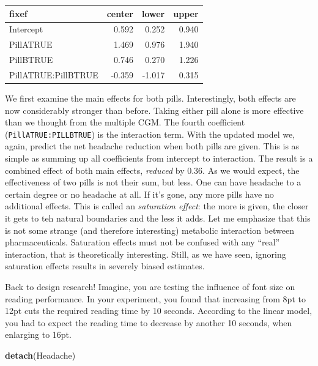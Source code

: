 \documentclass[]{svmono}
\newenvironment{Shaded}{\begin{snugshade}}{\end{snugshade}}
\newcommand{\KeywordTok}[1]{\textcolor[rgb]{0.13,0.29,0.53}{\textbf{#1}}}
\newcommand{\NormalTok}[1]{#1}
\theoremstyle{definition}
\theoremstyle{definition}
\theoremstyle{definition}
\theoremstyle{remark}
\begin{document}
\begin{longtable}[]{@{}lrrr@{}}
\toprule
fixef & center & lower & upper\tabularnewline
\midrule
\endhead
Intercept & 0.592 & 0.252 & 0.940\tabularnewline
PillATRUE & 1.469 & 0.976 & 1.940\tabularnewline
PillBTRUE & 0.746 & 0.270 & 1.226\tabularnewline
PillATRUE:PillBTRUE & -0.359 & -1.017 & 0.315\tabularnewline
\bottomrule
\end{longtable}

We first examine the main effects for both pills. Interestingly, both
effects are now considerably stronger than before. Taking either pill
alone is more effective than we thought from the multiple CGM. The
fourth coefficient (\texttt{PillATRUE:PILLBTRUE}) is the interaction
term. With the updated model we, again, predict the net headache
reduction when both pills are given. This is as simple as summing up all
coefficients from intercept to interaction. The result is a combined
effect of both main effects, \emph{reduced} by \(0.36\). As we would
expect, the effectiveness of two pills is not their sum, but less. One
can have headache to a certain degree or no headache at all. If it's
gone, any more pills have no additional effects. This is called an
\emph{saturation effect}: the more is given, the closer it gets to teh
natural boundaries and the less it adds. Let me emphasize that this is
not some strange (and therefore interesting) metabolic interaction
between pharmaceuticals. Saturation effects must not be confused with
any ``real'' interaction, that is theoretically interesting. Still, as
we have seen, ignoring saturation effects results in severely biased
estimates.

Back to design research! Imagine, you are testing the influence of font
size on reading performance. In your experiment, you found that
increasing from 8pt to 12pt cuts the required reading time by 10
seconds. According to the linear model, you had to expect the reading
time to decrease by another 10 seconds, when enlarging to 16pt.

\begin{Shaded}
\begin{Highlighting}[]
\KeywordTok{detach}\NormalTok{(Headache)}
\end{Highlighting}
\end{Shaded}
\end{document}
